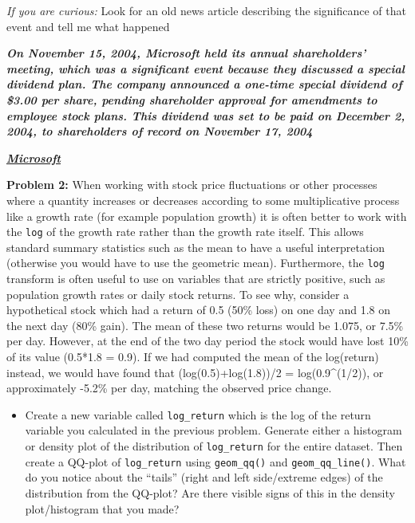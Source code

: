 \documentclass[
  letterpaper,
  DIV=11,
  numbers=noendperiod]{scrartcl}
\providecommand{\tightlist}{%
  \setlength{\itemsep}{0pt}\setlength{\parskip}{0pt}}\usepackage{longtable,booktabs,array}
\begin{document}
\emph{If you are curious:} Look for an old news article describing the
significance of that event and tell me what happened

\textbf{\emph{On November 15, 2004, Microsoft held its annual
shareholders' meeting, which was a significant event because they
discussed a special dividend plan. The company announced a one-time
special dividend of \$3.00 per share, pending shareholder approval for
amendments to employee stock plans. This dividend was set to be paid on
December 2, 2004, to shareholders of record on November 17,
2004\hspace{0pt}}}

\href{https://www.microsoft.com/investor/reports/ar04/nonflash/10k_fr_sp.html}{\textbf{\emph{Microsoft}}}

\textbf{Problem 2:} When working with stock price fluctuations or other
processes where a quantity increases or decreases according to some
multiplicative process like a growth rate (for example population
growth) it is often better to work with the \texttt{log} of the growth
rate rather than the growth rate itself. This allows standard summary
statistics such as the mean to have a useful interpretation (otherwise
you would have to use the geometric mean). Furthermore, the \texttt{log}
transform is often useful to use on variables that are strictly
positive, such as population growth rates or daily stock returns. To see
why, consider a hypothetical stock which had a return of 0.5 (50\% loss)
on one day and 1.8 on the next day (80\% gain). The mean of these two
returns would be 1.075, or 7.5\% per day. However, at the end of the two
day period the stock would have lost 10\% of its value (0.5*1.8 = 0.9).
If we had computed the mean of the log(return) instead, we would have
found that (log(0.5)+log(1.8))/2 = log(0.9\^{}(1/2)), or approximately
-5.2\% per day, matching the observed price change.

\begin{itemize}
\tightlist
\item
  Create a new variable called \texttt{log\_return} which is the log of
  the return variable you calculated in the previous problem. Generate
  either a histogram or density plot of the distribution of
  \texttt{log\_return} for the entire dataset. Then create a QQ-plot of
  \texttt{log\_return} using \texttt{geom\_qq()} and
  \texttt{geom\_qq\_line()}. What do you notice about the ``tails''
  (right and left side/extreme edges) of the distribution from the
  QQ-plot? Are there visible signs of this in the density plot/histogram
  that you made?
\end{itemize}
\end{document}
